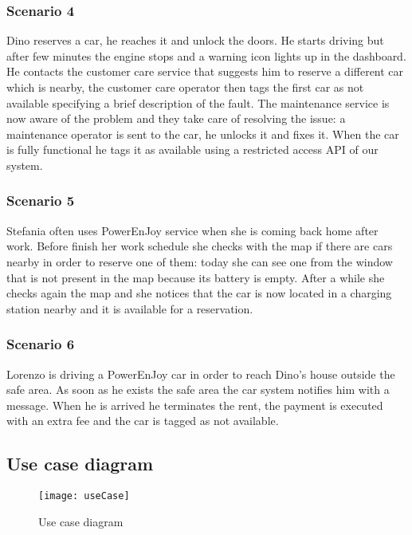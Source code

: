 \subsubsection{Scenario 4}
\label{scenario:4}
Dino reserves a car, he reaches it and unlock the doors. He starts driving but after few minutes the engine stops and a warning icon lights up in the dashboard. He contacts the customer care service that suggests him to reserve a different car which is nearby, the customer care operator then tags the first car as not available specifying a brief description of the fault. The maintenance service is now aware of the problem and they take care of resolving the issue: a maintenance operator is sent to the car, he unlocks it  and fixes it. When the car is fully functional he tags it as available using a restricted access API of our system.

\subsubsection{Scenario 5}
\label{scenario:5}
Stefania often uses PowerEnJoy service when she is coming back home after work. Before finish her work schedule she checks with the map if there are cars nearby in order to reserve one of them: today she can see one from the window that is not present in the map because its battery is empty. After a while she checks again the map and she notices that the car is now located in a charging station nearby and it is available for a reservation.
	
\subsubsection{Scenario 6}
\label{scenario:6}
Lorenzo is driving a PowerEnJoy car in order to reach Dino's house outside the safe area. As soon as he exists the safe area the car system notifies him with a message. When he is arrived he terminates the rent, the payment is executed with an extra fee and the car is tagged as not available.

\clearpage
\subsection{Use case diagram}

\begin{figure}[h!]
	\centering
	\texttt{[image: useCase]}
	\caption{
		\label{fig:useCase} 
		Use case diagram
	}
\end{figure}
\clearpage
